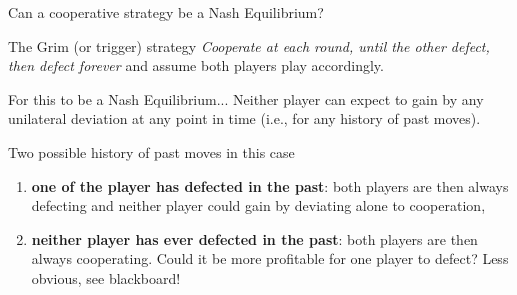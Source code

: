 \begin{frame}{Can a cooperative strategy be a Nash Equilibrium?}
    \begin{block}{The Grim (or trigger) strategy}
        \textit{Cooperate at each round, until the other defect,
        then defect forever} and assume both players play accordingly.
    \end{block}

    \pause
    \begin{exampleblock}{For this to be a Nash Equilibrium...}
        Neither player can expect to gain by any unilateral deviation at any point
        in time (i.e., for any history of past moves).
        
        Two possible history of past moves in this case
        \begin{enumerate}
            \pause
            \item \textbf{one of the player has defected in the past}: both players are then always defecting
            and neither player could gain by deviating alone to cooperation, \pause
            \item \textbf{neither player has ever defected in the past}: both players are then always
            cooperating.
            Could it be more profitable for one player to defect? Less obvious, see blackboard!
        \end{enumerate}
    \end{exampleblock}
\end{frame}
    


